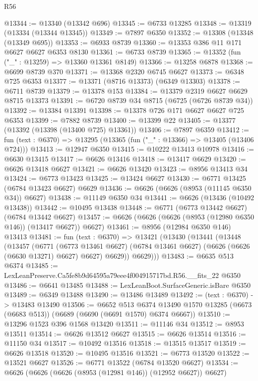 \begin{lexlean}{R56}
\begin{coremodule}
@13344 := @13340 (@13342 @696)
@13345 := @6733 @13285
@13348 := @13319 (@13334 (@13344 @13345))
@13349 := @7897 @6350
@13352 := @13308 (@13348 (@13349 @695))
@13353 := @6933 @8739
@13360 := @13353 @386 @11 @171 @6627 @6627 @6353 @8130
@13361 := @6733 @8739
@13365 := @13352 (fun ("_" : @13259) => @13360 @13361 @8149)
@13366 := @13258 @6878
@13368 := @6699 @8739 @370
@13371 := @13368 @2320 @6745 @6627
@13373 := @6348 @725 @6353
@13377 := @13371 (@8716 @13373) (@6349 @13303)
@13378 := @6711 @8739
@13379 := @13378 @153
@13384 := @13379 @2319 @6627 @6629 @8715 @13373
@13391 := @6720 @8739 @34 @8715 (@6725 (@6726 @8739 @34))
@13392 := @13384 @13391
@13398 := @13378 @726 @171 @6627 @6627 @725 @6353
@13399 := @7882 @8739
@13400 := @13399 @22
@13405 := @13377 (@13392 (@13398 (@13400 @725) @13361))
@13406 := @7897 @6359
@13412 := fun (text : @6370) => @13295 (@13365 (fun ("_" : @13366) => @13405 (@13406 @724)))
@13413 := @12947 @6350
@13415 := @10222 @13413 @10978
@13416 := @6630 @13415
@13417 := @6626 @13416
@13418 := @13417 @6629
@13420 := @6626 @13418 @6627
@13421 := @6626 @13420
@13423 := @8956 @13413 @34
@13424 := @6773 @13423
@13425 := @13424 @6627
@13430 := @6771 @13425 (@6784 @13423 @6627) @6629
@13436 := @6626 (@6626 (@8953 (@11145 @6350 @34)) @6627)
@13438 := @11149 @6350 @34
@13441 := @6626 (@13436 (@10492 @13438))
@13442 := @10495 @13438
@13448 := @6771 (@6773 @13442 @6627) (@6784 @13442 @6627)
@13457 := @6626 (@6626 (@6626 (@8953 (@12980 @6350 @146)) (@13417 @6627)) @6627)
@13461 := @8956 (@12984 @6350 @146) @13413
@13481 := fun (text : @6370) =>
  @13421
    (@13430
      (@13441
        (@13448
          (@13457
            (@6771
              (@6773 @13461 @6627)
              (@6784 @13461 @6627)
              (@6626 (@6626 (@6630 @13271) @6627) @6627)
              @6629))
          @6629)))
@13483 := @6635 @513 @6374
@13485 := LexLeanPreserve.Ca5fe8b9d64595a79eee4f004915717bd.R56.__fits_22 @6350
@13486 := @6641 @13485
@13488 := LexLeanBoot.SurfaceGeneric.isBare @6350
@13489 := @6349 @13488
@13490 := @13486 @13489
@13492 := (text : @6370) -> @13483 @13490
@13506 := @6652
    @513
    @6374
    @13490
    @1570
    @13285
    (@6673 (@6683 @513))
    (@6689 (@6690 (@6691 @1570) @6374 @6667))
@13510 := @13296 @1523 @396 @1568 @13420
@13511 := @11146 @34
@13512 := @8953 @13511
@13514 := @6626 @13512 @6627
@13515 := @6626 @13514
@13516 := @11150 @34
@13517 := @10492 @13516
@13518 := @13515 @13517
@13519 := @6626 @13518
@13520 := @10495 @13516
@13521 := @6773 @13520
@13522 := @13521 @6627
@13526 := @6771 @13522 (@6784 @13520 @6627)
@13534 := @6626 (@6626 (@6626 (@8953 (@12981 @146)) (@12952 @6627)) @6627)

\end{coremodule}
\end{lexlean}
